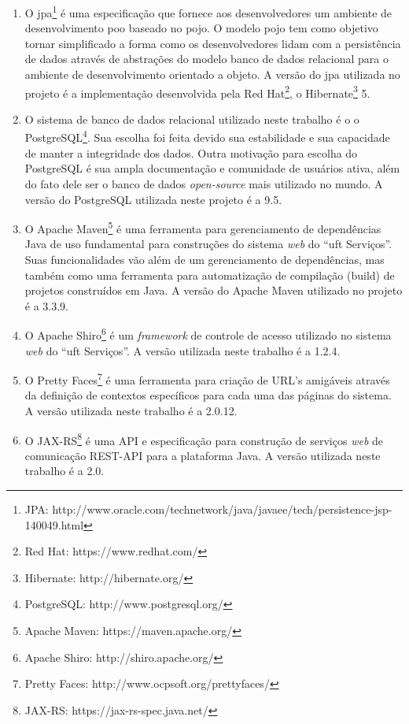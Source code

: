 \begin{enumerate}
    \item O \gls{jpa}\footnote{JPA: http://www.oracle.com/technetwork/java/javaee/tech/persistence-jsp-140049.html} é uma especificação que fornece aos desenvolvedores um ambiente de desenvolvimento \gls{poo} baseado no \gls{pojo}. O modelo \acrshort{pojo} tem como objetivo tornar simplificado a forma como os desenvolvedores lidam com a persistência de dados através de abstrações do modelo banco de dados relacional para o ambiente de desenvolvimento orientado a objeto. A versão do \acrshort{jpa} utilizada no projeto é a implementação desenvolvida pela Red Hat\footnote{Red Hat: https://www.redhat.com/}, o Hibernate\footnote{Hibernate: http://hibernate.org/} 5.
    
    \item O sistema de banco de dados relacional utilizado neste trabalho é o o PostgreSQL\footnote{PostgreSQL: http://www.postgresql.org/}. Sua escolha foi feita devido sua estabilidade e sua capacidade de manter a integridade dos dados. Outra motivação para escolha do PostgreSQL é sua ampla documentação e comunidade de usuários ativa, além do fato dele ser o banco de dados \textit{open-source} mais utilizado no mundo. A versão do PostgreSQL utilizada neste projeto é a 9.5.
    
    \item O Apache Maven\footnote{Apache Maven: https://maven.apache.org/} é uma ferramenta para gerenciamento de dependências Java de uso fundamental para construções do sistema \textit{web} do ``\acrshort{uft} Serviços''. Suas funcionalidades vão além de um gerenciamento de dependências, mas também como uma ferramenta para automatização de compilação (build) de projetos construídos em Java. A versão do Apache Maven utilizado no projeto é a 3.3.9.
    
    \item O Apache Shiro\footnote{Apache Shiro: http://shiro.apache.org/} é um \textit{framework} de controle de acesso utilizado no sistema \textit{web} do ``\acrshort{uft} Serviços''. A versão utilizada neste trabalho é a 1.2.4.
    
    \item O Pretty Faces\footnote{Pretty Faces: http://www.ocpsoft.org/prettyfaces/} é uma ferramenta para criação de URL's amigáveis através da definição de contextos específicos para cada uma das páginas do sistema. A versão utilizada neste trabalho é a 2.0.12.
    
    \item O JAX-RS\footnote{JAX-RS: https://jax-rs-spec.java.net/} é uma API e especificação para construção de serviços \textit{web} de comunicação REST-API para a plataforma Java. A versão utilizada neste trabalho é a 2.0.
    

\end{enumerate}
